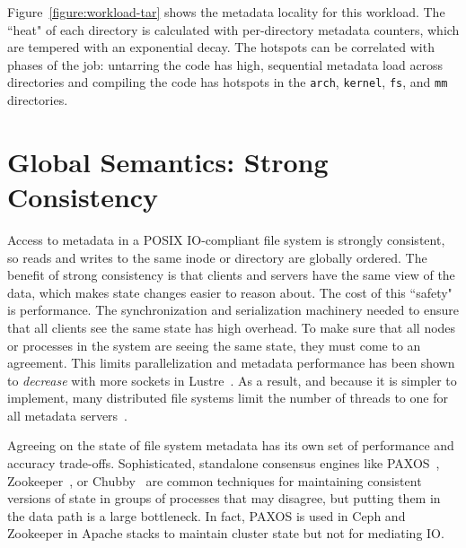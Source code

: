 Figure~\ref{figure:workload-tar} shows the metadata locality for this workload.
The ``heat" of each directory is calculated with per-directory metadata
counters, which are tempered with an exponential decay.  The hotspots can be
correlated with phases of the job: untarring the code has high, sequential
metadata load across directories and compiling the code has hotspots in the
\texttt{arch}, \texttt{kernel}, \texttt{fs}, and \texttt{mm} directories.  

\section{Global Semantics: Strong Consistency}

Access to metadata in a POSIX IO-compliant file system is strongly consistent,
so reads and writes to the same inode or directory are globally ordered.  The
benefit of strong consistency is that clients and servers have the same view of
the data, which makes state changes easier to reason about.  The cost of this
``safety" is performance.  The synchronization and serialization machinery
needed to ensure that all clients see the same state has high overhead.  To
make sure that all nodes or processes in the system are seeing the same state,
they must come to an agreement.  This limits parallelization and metadata
performance has been shown to {\it decrease} with more sockets in
Lustre~\cite{konstantinos:pdsw2014-lustre-metadata}. As a result, and because
it is simpler to implement, many distributed file systems limit the number of
threads to one for all metadata servers~\cite{weil:osdi2006-ceph,
alam:pdsw2011-metadata-scaling, ren:sc2014-indexfs}. 

Agreeing on the state of file system metadata has its own set of performance and accuracy trade-offs.
Sophisticated, standalone consensus engines like
PAXOS~\cite{lamport_parttime_1998}, Zookeeper~\cite{hunt_zookeeper_2010}, or
Chubby~\cite{burrows_chubby_2006} are common techniques for maintaining
consistent versions of state in groups of processes that may disagree, but
putting them in the data path is a large bottleneck. In fact, PAXOS is used in
Ceph and Zookeeper in Apache stacks to maintain cluster state but not for
mediating IO.  

